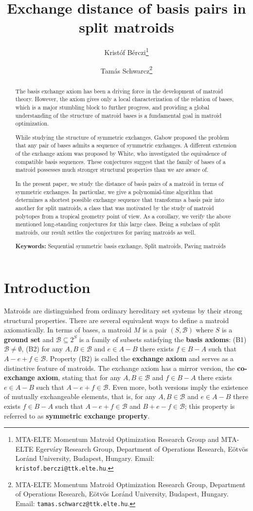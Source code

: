 \documentclass[11pt,a4paper]{article}
\title{Exchange distance of basis pairs in split matroids}
\author{
Kristóf Bérczi\thanks{MTA-ELTE Momentum Matroid Optimization Research Group and MTA-ELTE Egerváry Research Group, Department of Operations Research, Eötvös Loránd University, Budapest, Hungary. Email: \texttt{kristof.berczi@ttk.elte.hu}.}
\and
Tamás Schwarcz\thanks{MTA-ELTE Momentum Matroid Optimization Research Group, Department of Operations Research, Eötvös Loránd University, Budapest, Hungary. Email: \texttt{tamas.schwarcz@ttk.elte.hu}.}
}
\date{}
\theoremstyle{plain}
\theoremstyle{definition}
\newcommand{\cB}{\mathcal{B}}
\begin{document}
\maketitle

\begin{abstract}
The basis exchange axiom has been a driving force in the development of matroid theory. However, the axiom gives only a local characterization of the relation of bases, which is a major stumbling block to further progress, and providing a global understanding of the structure of matroid bases is a fundamental goal in matroid optimization. 

While studying the structure of symmetric exchanges, Gabow proposed the problem that any pair of bases admits a sequence of symmetric exchanges. A different extension of the exchange axiom was proposed by White, who investigated the equivalence of compatible basis sequences. These conjectures suggest that the family of bases of a matroid possesses much stronger structural properties than we are aware of.

In the present paper, we study the distance of basis pairs of a matroid in terms of symmetric exchanges. In particular, we give a polynomial-time algorithm that determines a shortest possible exchange sequence that transforms a basis pair into another for split matroids, a class that was motivated by the study of matroid polytopes from a tropical geometry point of view. As a corollary, we verify the above mentioned long-standing conjectures for this large class. Being a subclass of split matroids, our result settles the conjectures for paving matroids as well.

\medskip

\noindent \textbf{Keywords:} Sequential symmetric basis exchange, Split matroids, Paving matroids
\end{abstract}

\section{Introduction}

Matroids are distinguished from ordinary hereditary set systems by their strong structural properties. There are several equivalent ways to define a matroid axiomatically. In terms of bases, a matroid $M$ is a pair $(S,\mathcal{B})$ where $S$ is a \textbf{ground set} and $\mathcal{B}\subseteq 2^S$ is a family of subsets satisfying the \textbf{basis axioms}: (B1) $\mathcal{B}\neq\emptyset$, (B2) for any $A,B\in \mathcal{B}$ and $e\in A- B$ there exists $f\in B- A$ such that $A-e+f\in\mathcal{B}$. Property (B2) is called the \textbf{exchange axiom} and serves as a distinctive feature of matroids. The exchange axiom has a mirror version, the \textbf{co-exchange axiom}, stating that for any $A,B\in \mathcal{B}$ and $f\in B-A$ there exists $e\in A-B$ such that $A-e+f\in\mathcal{B}$. Even more, both versions imply the existence of mutually exchangeable elements, that is, for any $A,B\in \mathcal{B}$ and $e\in A-B$ there exists $f\in B-A$ such that $A-e+f\in\cB$ and $B+e-f\in\mathcal{B}$; this property is referred to as \textbf{symmetric exchange property}. 
\end{document}
